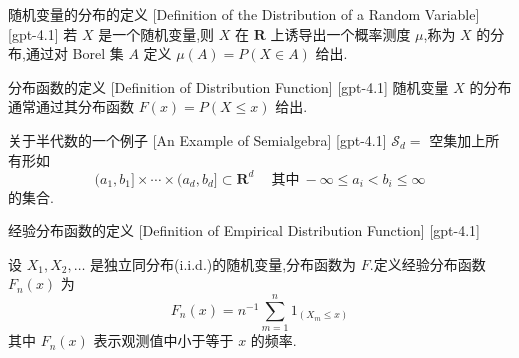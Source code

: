 \documentclass[UTF8]{ctexart}
\begin{document}
    
    
    \begin{dfn}
        {随机变量的分布的定义}
        [Definition of the Distribution of a Random Variable]
        [gpt-4.1]
        若 $X$ 是一个随机变量,则 $X$ 在 $\mathbf{R}$ 上诱导出一个概率测度 $\mu$,称为 $X$ 的分布,通过对 Borel 集 $A$ 定义 $\mu(A) = P(X \in A)$ 给出.
    \end{dfn}
    
    
    
    \begin{dfn}
        {分布函数的定义}
        [Definition of Distribution Function]
        [gpt-4.1]
        随机变量 $X$ 的分布通常通过其分布函数 $F(x) = P(X \leq x)$ 给出.
    \end{dfn}
    
    
    
    \begin{xmp}
        {关于半代数的一个例子}
        [An Example of Semialgebra]
        [gpt-4.1]
        $\mathcal{S}_d =$ 空集加上所有形如
\[
(a_1, b_1] \times \cdots \times (a_d, b_d] \subset \mathbf{R}^d \quad \mathrm{~其中~} -\infty \leq a_i < b_i \leq \infty
\]
的集合.
    \end{xmp}
    
    
    
    \begin{dfn}
        {经验分布函数的定义}
        [Definition of Empirical Distribution Function]
        [gpt-4.1]
        
设 $X_{1}, X_{2}, \dots$ 是独立同分布(i.i.d.)的随机变量,分布函数为 $F$.定义经验分布函数 $F_{n}(x)$ 为
\[
F_{n}(x) = n^{-1} \sum_{m=1}^{n} 1_{(X_{m} \leq x)}
\]
其中 $F_{n}(x)$ 表示观测值中小于等于 $x$ 的频率.

    \end{dfn}
    
    
    
\end{document}
